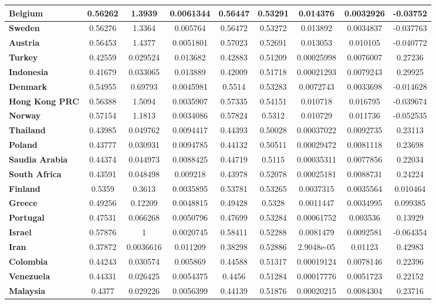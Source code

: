 \begin{tiny}
\begin{tabular}{|l|c|c|c|c|c|c|c|c|}
\textbf{Belgium}&0.56262&1.3939&0.0061344&0.56447&0.53291&0.014376&0.0032926&-0.03752\\\hline
\textbf{Sweden}&0.56276&1.3364&0.005764&0.56472&0.53272&0.013892&0.0034837&-0.037763\\\hline
\textbf{Austria}&0.56453&1.4377&0.0051801&0.57023&0.52691&0.013053&0.010105&-0.040772\\\hline
\textbf{Turkey}&0.42559&0.029524&0.013682&0.42883&0.51209&0.00025998&0.0076007&0.27236\\\hline
\textbf{Indonesia}&0.41679&0.033065&0.013889&0.42009&0.51718&0.00021293&0.0079243&0.29925\\\hline
\textbf{Denmark}&0.54955&0.69793&0.0045981&0.5514&0.53283&0.0072743&0.0033698&-0.014628\\\hline
\textbf{Hong Kong PRC}&0.56388&1.5094&0.0035907&0.57335&0.54151&0.010718&0.016795&-0.039674\\\hline
\textbf{Norway}&0.57154&1.1813&0.0034086&0.57824&0.5312&0.010729&0.011736&-0.052535\\\hline
\textbf{Thailand}&0.43985&0.049762&0.0094417&0.44393&0.50028&0.00037022&0.0092735&0.23113\\\hline
\textbf{Poland}&0.43777&0.030931&0.0094785&0.44132&0.50511&0.00029472&0.0081118&0.23698\\\hline
\textbf{Saudia Arabia}&0.44374&0.044973&0.0088425&0.44719&0.5115&0.00035311&0.0077856&0.22034\\\hline
\textbf{South Africa}&0.43591&0.048498&0.009218&0.43978&0.52078&0.00025181&0.0088731&0.24224\\\hline
\textbf{Finland}&0.5359&0.3613&0.0035895&0.53781&0.53265&0.0037315&0.0035564&0.010464\\\hline
\textbf{Greece}&0.49256&0.12209&0.0048815&0.49428&0.5328&0.0011447&0.0034995&0.099385\\\hline
\textbf{Portugal}&0.47531&0.066268&0.0050796&0.47699&0.53284&0.00061752&0.003536&0.13929\\\hline
\textbf{Israel}&0.57876&1&0.0020745&0.58411&0.52288&0.0081479&0.0092581&-0.064354\\\hline
\textbf{Iran}&0.37872&0.0036616&0.011209&0.38298&0.52886&2.9048e-05&0.01123&0.42983\\\hline
\textbf{Colombia}&0.44243&0.030574&0.005869&0.44588&0.51317&0.00019124&0.0078146&0.22396\\\hline
\textbf{Venezuela}&0.44331&0.026425&0.0054375&0.4456&0.51284&0.00017776&0.0051723&0.22152\\\hline
\textbf{Malaysia}&0.4377&0.029226&0.0056399&0.44139&0.51876&0.00020215&0.0084304&0.23716\\\hline

\end{tabular}
\end{tiny}
